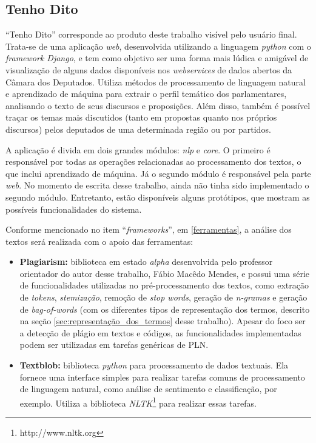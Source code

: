 \clearpage

\subsection{Tenho Dito}

``Tenho Dito'' corresponde ao produto deste trabalho visível pelo usuário final. Trata-se de uma aplicação \textit{web}, desenvolvida utilizando a linguagem \textit{python} com o \textit{framework Django}, e tem como objetivo ser uma forma mais lúdica e amigável de visualização de alguns dados disponíveis nos \textit{webservices} de dados abertos da Câmara dos Deputados. Utiliza métodos de processamento de linguagem natural e aprendizado de máquina para extrair o perfil temático dos parlamentares, analisando o texto de seus discursos e proposições. Além disso, também é possível traçar os temas mais discutidos (tanto em propostas quanto nos próprios discursos) pelos deputados de uma determinada região ou por partidos.

A aplicação é divida em dois grandes módulos: \textit{nlp} e \textit{core}. O primeiro é responsável por todas as operações relacionadas ao processamento dos textos, o que inclui aprendizado de máquina. Já o segundo módulo é responsável pela parte \textit{web}. No momento de escrita desse trabalho, ainda não tinha sido implementado o segundo módulo. Entretanto, estão disponíveis alguns protótipos, que mostram as possíveis funcionalidades do sistema.

Conforme mencionado no item ``\textit{frameworks}'', em \ref{ferramentas}, a análise dos textos será realizada com o apoio das ferramentas:

\begin{itemize}
    \item \textbf{Plagiarism:} biblioteca em estado \textit{alpha} desenvolvida pelo professor orientador do autor desse trabalho, Fábio Macêdo Mendes, e possui uma série de funcionalidades utilizadas no pré-processamento dos textos, como extração de \textit{tokens}, \textit{stemização}, remoção de \textit{stop words}, geração de \textit{n-gramas} e geração de \textit{bag-of-words} (com os diferentes tipos de representação dos termos, descrito na seção \ref{sec:representação_dos_termos} desse trabalho). Apesar do foco ser a detecção de plágio em textos e códigos, as funcionalidades implementadas podem ser utilizadas em tarefas genéricas de PLN.
    \item \textbf{Textblob:} biblioteca \textit{python} para processamento de dados textuais. Ela fornece uma interface simples para realizar tarefas comuns de processamento de linguagem natural, como análise de sentimento e classificação, por exemplo. Utiliza a biblioteca \textit{NLTK}\footnote{http://www.nltk.org} para realizar essas tarefas.
\end{itemize}

